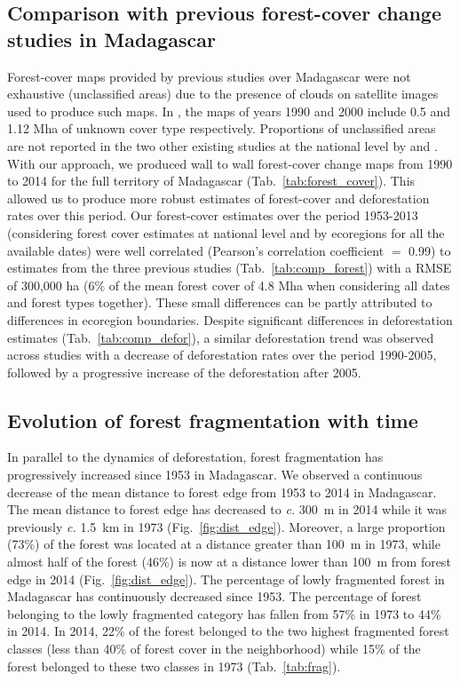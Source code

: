 \documentclass[a4paper, 12pt, leqno]{article} %
\begin{document}
\subsection{Comparison with previous forest-cover change studies
in Madagascar}

Forest-cover maps provided by previous studies over Madagascar were
not exhaustive (unclassified areas) due to the presence of clouds on
satellite images used to produce such maps. In \citet{Harper2007}, the
maps of years 1990 and 2000 include 0.5 and 1.12 Mha of unknown cover
type respectively. Proportions of unclassified areas are not reported
in the two other existing studies at the national level by
\citet{MEFT2009} and \citet{ONE2015}. With our approach, we produced
wall to wall forest-cover change maps from 1990 to 2014 for the full
territory of Madagascar (Tab.~\ref{tab:forest_cover}). This allowed us
to produce more robust estimates of forest-cover and deforestation
rates over this period. Our forest-cover estimates over the period
1953-2013 (considering forest cover estimates at national level and by
ecoregions for all the available dates) were well correlated
(Pearson's correlation coefficient $=$ 0.99) to estimates from the
three previous studies (Tab.~\ref{tab:comp_forest}) with a RMSE of
300,000 ha (6\% of the mean forest cover of 4.8 Mha when considering
all dates and forest types together). These small differences can be
partly attributed to differences in ecoregion boundaries. Despite
significant differences in deforestation estimates
(Tab.~\ref{tab:comp_defor}), a similar deforestation trend was
observed across studies with a decrease of deforestation rates over
the period 1990-2005, followed by a progressive increase of the
deforestation after 2005.

\subsection{Evolution of forest fragmentation with time}

In parallel to the dynamics of deforestation, forest fragmentation has
progressively increased since 1953 in Madagascar. We observed a
continuous decrease of the mean distance to forest edge from 1953 to
2014 in Madagascar. The mean distance to forest edge has decreased to
\emph{c.} 300~m in 2014 while it was previously \emph{c.} 1.5~km in
1973 (Fig.~\ref{fig:dist_edge}). Moreover, a large proportion (73\%)
of the forest was located at a distance greater than 100~m in 1973,
while almost half of the forest (46\%) is now at a distance lower than
100~m from forest edge in 2014 (Fig.~\ref{fig:dist_edge}). The
percentage of lowly fragmented forest in Madagascar has continuously
decreased since 1953. The percentage of forest belonging to the lowly
fragmented category has fallen from 57\% in 1973 to 44\% in 2014. In
2014, 22\% of the forest belonged to the two highest
fragmented forest classes (less than 40\% of forest cover in the
neighborhood) while 15\% of the forest belonged to these two
classes in 1973 (Tab.~\ref{tab:frag}).
\end{document}

